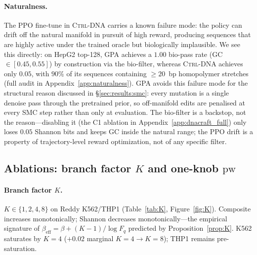 \documentclass{article}
\theoremstyle{definition}
\theoremstyle{remark}
\newcommand{\gpa}{\textsc{GPA}\xspace}
\newcommand{\ctrldna}{\textsc{Ctrl-DNA}\xspace}
\begin{document}
\paragraph{Naturalness.}
The PPO fine-tune in \ctrldna{} carries a known failure mode: the policy can drift off the natural manifold in pursuit of high reward, producing sequences that are highly active under the trained oracle but biologically implausible. We see this directly: on HepG2 top-128, \gpa{} achieves a $1.00$ bio-pass rate (GC $\in[0.45,0.55]$) by construction via the bio-filter, whereas \ctrldna{} achieves only $0.05$, with $90\%$ of its sequences containing $\geq\!20$~bp homopolymer stretches (full audit in Appendix~\ref{app:naturalness}). \gpa{} avoids this failure mode for the structural reason discussed in \S\ref{sec:results:smc}: every mutation is a single denoise pass through the pretrained prior, so off-manifold edits are penalised at every SMC step rather than only at evaluation. The bio-filter is a backstop, not the reason---disabling it (the C1 ablation in Appendix~\ref{app:dnacraft_full}) only loses $0.05$ Shannon bits and keeps GC inside the natural range; the PPO drift is a property of trajectory-level reward optimization, not of any specific filter.

\subsection{Ablations: branch factor $K$ and one-knob $\mathrm{pw}$}\label{sec:results:ablation}

\paragraph{Branch factor $K$.}
$K\!\in\!\{1,2,4,8\}$ on Reddy K562/THP1 (Table~\ref{tab:K}, Figure~\ref{fig:K}). Composite increases monotonically; Shannon decreases monotonically—the empirical signature of $\beta_{\mathrm{eff}}\!=\!\beta\!+\!(K\!-\!1)/\log F_q$ predicted by Proposition~\ref{prop:K}. K562 saturates by $K\!=\!4$ ($+0.02$ marginal $K\!=\!4\!\to\!K\!=\!8$); THP1 remains pre-saturation.
\end{document}
